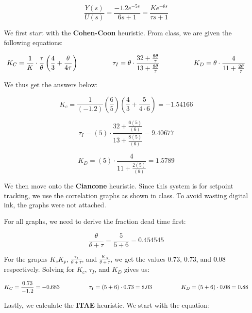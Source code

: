 \documentclass[12pt]{article}
\begin{document}
\begin{enumerate}
\begin{enumerate}
    \begin{equation}
      \frac{Y(s)}{U(s)} = \frac{-1.2e^{-5s}}{6s + 1} = \frac{Ke^{-\theta s}}{\tau s + 1}
    \end{equation}

    We first start with the \textbf{Cohen-Coon} heuristic. From class, we are given the following equations:

    $$
      K_C = \frac{1}{K} \cdot \frac{\tau}{\theta} \left( \frac{4}{3} + \frac{\theta}{4\tau} \right) \quad \quad \quad \quad \quad
      \tau_I = \theta \cdot \frac{32 + \frac{6\theta}{\tau}}{13 + \frac{8\theta}{\tau}} \quad \quad \quad \quad \quad
      K_D = \theta \cdot \frac{4}{11 + \frac{2\theta}{\tau}} \\
    $$

    We thus get the answers below:

    \[
    K_c = \frac{1}{\left(-1.2\right)} \left( \frac{6}{5} \right) \left( \frac{4}{3} + {\frac{5}{4 \cdot 6}} \right) = -1.54166
    \]

    \[
      \tau_I = \left(5\right) \cdot \frac{32 + \frac{6\left(5\right)}{\left(6\right)}}{13 + \frac{8\left(5\right)}{\left(6\right)}} = 9.40677
    \]

    \[
      K_D = \left(5\right) \cdot \frac{4}{11 + \frac{2\left(5\right)}{\left(6\right)}} = 1.5789
    \]

    We then move onto the \textbf{Ciancone} heuristic. Since this system is for setpoint tracking, we use the correlation graphs as shown in class. To avoid wasting digital ink, the graphs were not attached.

    For all graphs, we need to derive the fraction dead time first:

    \[
      \frac{\theta}{\theta + \tau} = \frac{5}{5 + 6} = 0.454545
    \]

    For the graphs \( K_c K_p \), \( \frac{\tau_I}{\theta + \tau} \), and \( \frac{K_D}{\theta + \tau} \), we get the values 0.73, 0.73, and 0.08 respectively. Solving for \( K_c \), \( \tau_I \), and \( K_D \) gives us:

    $$
      K_C = \frac{0.73}{-1.2} = -0.683 \quad \quad \quad \quad \quad
      \tau_I = \left(5 + 6\right) \cdot 0.73 = 8.03 \quad \quad \quad \quad \quad
      K_D = \left(5 + 6\right) \cdot 0.08 = 0.88 \\
    $$

    \pagebreak

    Lastly, we calculate the \textbf{ITAE} heuristic. We start with the equation:


\end{enumerate}
\end{enumerate}
\end{document}
